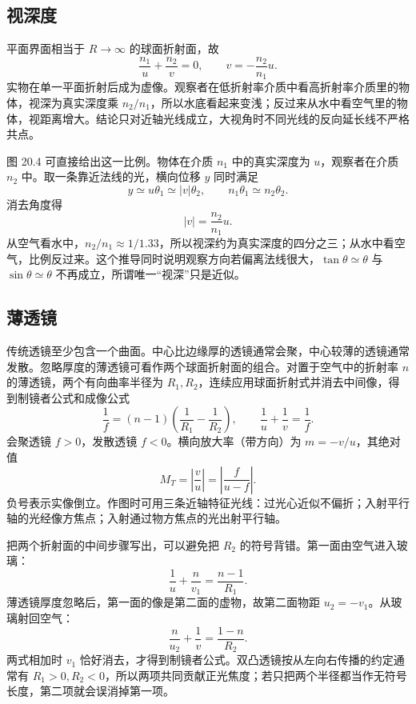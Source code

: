 \subsection*{视深度}

平面界面相当于 $R\to\infty$ 的球面折射面，故
\begin{equation}
 \frac{n_1}{u}+\frac{n_2}{v}=0,\qquad v=-\frac{n_2}{n_1}u.
\end{equation}
实物在单一平面折射后成为虚像。观察者在低折射率介质中看高折射率介质里的物体，视深为真实深度乘 $n_2/n_1$，所以水底看起来变浅；反过来从水中看空气里的物体，视距离增大。结论只对近轴光线成立，大视角时不同光线的反向延长线不严格共点。

图 20.4 可直接给出这一比例。物体在介质 $n_1$ 中的真实深度为 $u$，观察者在介质 $n_2$ 中。取一条靠近法线的光，横向位移 $y$ 同时满足
\[
 y\simeq u\theta_1\simeq |v|\theta_2,
 \qquad n_1\theta_1\simeq n_2\theta_2.
\]
消去角度得
\[
 |v|=\frac{n_2}{n_1}u.
\]
从空气看水中，$n_2/n_1\approx1/1.33$，所以视深约为真实深度的四分之三；从水中看空气，比例反过来。这个推导同时说明观察方向若偏离法线很大，$\tan\theta\simeq\theta$ 与 $\sin\theta\simeq\theta$ 不再成立，所谓唯一“视深”只是近似。

\ApparentDepthDiagram

\subsection*{薄透镜}

传统透镜至少包含一个曲面。中心比边缘厚的透镜通常会聚，中心较薄的透镜通常发散。忽略厚度的薄透镜可看作两个球面折射面的组合。对置于空气中的折射率 $n$ 的薄透镜，两个有向曲率半径为 $R_1,R_2$，连续应用球面折射式并消去中间像，得到制镜者公式和成像公式
\begin{equation}
 \frac1f=(n-1)\left(\frac1{R_1}-\frac1{R_2}\right),
 \qquad
 \frac1u+\frac1v=\frac1f.
\end{equation}
会聚透镜 $f>0$，发散透镜 $f<0$。横向放大率（带方向）为 $m=-v/u$，其绝对值
\begin{equation}
 M_T=\left|\frac vu\right|=\left|\frac f{u-f}\right|.
\end{equation}
负号表示实像倒立。作图时可用三条近轴特征光线：过光心近似不偏折；入射平行轴的光经像方焦点；入射通过物方焦点的光出射平行轴。

把两个折射面的中间步骤写出，可以避免把 $R_2$ 的符号背错。第一面由空气进入玻璃：
\[
 \frac1u+\frac n{v_1}=\frac{n-1}{R_1}.
\]
薄透镜厚度忽略后，第一面的像是第二面的虚物，故第二面物距 $u_2=-v_1$。从玻璃射回空气：
\[
 \frac n{u_2}+\frac1v=\frac{1-n}{R_2}.
\]
两式相加时 $v_1$ 恰好消去，才得到制镜者公式。双凸透镜按从左向右传播的约定通常有 $R_1>0,R_2<0$，所以两项共同贡献正光焦度；若只把两个半径都当作无符号长度，第二项就会误消掉第一项。

